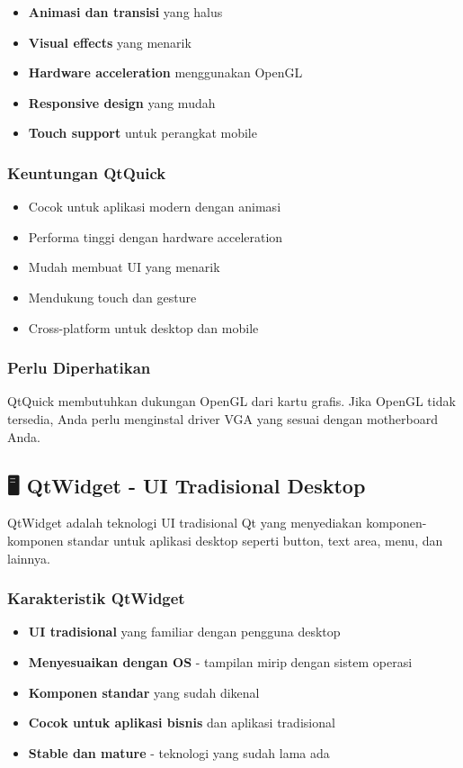\begin{itemize}
\item \textbf{Animasi dan transisi} yang halus
\item \textbf{Visual effects} yang menarik
\item \textbf{Hardware acceleration} menggunakan OpenGL
\item \textbf{Responsive design} yang mudah
\item \textbf{Touch support} untuk perangkat mobile
\end{itemize}

\subsubsection{Keuntungan QtQuick}

\begin{itemize}
\item Cocok untuk aplikasi modern dengan animasi
\item Performa tinggi dengan hardware acceleration
\item Mudah membuat UI yang menarik
\item Mendukung touch dan gesture
\item Cross-platform untuk desktop dan mobile
\end{itemize}

\subsubsection{Perlu Diperhatikan}

QtQuick membutuhkan dukungan OpenGL dari kartu grafis. Jika OpenGL tidak tersedia, Anda perlu menginstal driver VGA yang sesuai dengan motherboard Anda.

\subsection{🖥️ QtWidget - UI Tradisional Desktop}

QtWidget adalah teknologi UI tradisional Qt yang menyediakan komponen-komponen standar untuk aplikasi desktop seperti button, text area, menu, dan lainnya.

\subsubsection{Karakteristik QtWidget}

\begin{itemize}
\item \textbf{UI tradisional} yang familiar dengan pengguna desktop
\item \textbf{Menyesuaikan dengan OS} - tampilan mirip dengan sistem operasi
\item \textbf{Komponen standar} yang sudah dikenal
\item \textbf{Cocok untuk aplikasi bisnis} dan aplikasi tradisional
\item \textbf{Stable dan mature} - teknologi yang sudah lama ada
\end{itemize}

